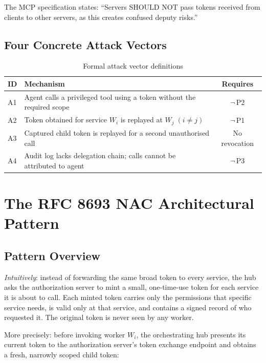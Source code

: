 \documentclass[journal]{IEEEtran}
\begin{document}
The MCP specification \cite{mcp_security} states: ``Servers SHOULD NOT pass
tokens received from clients to other servers, as this creates confused deputy
risks.''

\subsection{Four Concrete Attack Vectors}

\begin{table}[h]
\caption{Formal attack vector definitions}
\label{tab:attack_formal}
\centering
\footnotesize
\setlength{\tabcolsep}{3pt}
\begin{tabularx}{\columnwidth}{l X c}
\toprule
\textbf{ID} & \textbf{Mechanism} & \textbf{Requires} \\
\midrule
A1 & Agent calls a privileged tool using a token without the required scope
     & $\neg$\,P2 \\
A2 & Token obtained for service $W_i$ is replayed at $W_j\;(i\neq j)$
     & $\neg$\,P1 \\
A3 & Captured child token is replayed for a second unauthorised call
     & No revocation \\
A4 & Audit log lacks delegation chain; calls cannot be attributed to agent
     & $\neg$\,P3 \\
\bottomrule
\end{tabularx}
\end{table}


\section{The RFC 8693 NAC Architectural Pattern}
\label{sec:solution}

\subsection{Pattern Overview}

\textit{Intuitively}: instead of forwarding the same broad token to every service,
the hub asks the authorization server to mint a small, one-time-use token for
each service it is about to call. Each minted token carries only the permissions
that specific service needs, is valid only at that service, and contains a signed
record of who requested it. The original token is never seen by any worker.

More precisely: before invoking worker $W_i$, the orchestrating hub presents its
current token to the authorization server's token exchange endpoint and obtains a
fresh, narrowly scoped child token:
\end{document}
